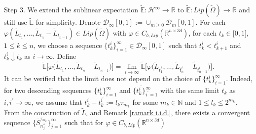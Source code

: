 \documentclass[a4paper,oneside,10pt]{article}%
\numberwithin{equation}{section}
\begin{document}
Step 3. We extend the sublinear expectation $\mathbb{\tilde{E}}:\mathcal{H}
^{\infty}\rightarrow \mathbb{R}$ to $\mathbb{\tilde{E}}:Lip(\tilde{\Omega
})\rightarrow \mathbb{R}$ and still use $\mathbb{\tilde{E}}$ for simplicity.
Denote $\mathcal{D}_{\infty}[0,1]:=\cup_{m\geq0}\mathcal{D}_{m}[0,1]$. For
each $\varphi(\tilde{L}_{t_{1}},\ldots,\tilde{L}_{t_{n}}-\tilde{L}_{t_{n-1}
})\in Lip(\tilde{\Omega})$ with $\varphi \in C_{b,Lip}(\mathbb{R}^{n\times3d}
)$, for each $t_{k}\in \lbrack0,1]$, $1\leq k\leq n$, we choose a sequence
$\{t_{k}^{i}\}_{i=1}^{\infty}\in \mathcal{D}_{\infty}[0,1]$ such that
$t_{k}^{i}<t_{k+1}^{i}$ and $t_{k}^{i}\downarrow t_{k}$ as $i\rightarrow
\infty$. Define
\[
\mathbb{\tilde{E}}\big[\varphi \big(\tilde{L}_{t_{1}},\ldots,\tilde{L}_{t_{n}%
}-\tilde{L}_{t_{n-1}}\big)\big]=\lim_{i\rightarrow \infty}\mathbb{\tilde{E}%
}\big[\varphi \big(\tilde{L}_{t_{1}^{i}},\ldots,\tilde{L}_{t_{n}^{i}}-\tilde
{L}_{t_{n-1}^{i}}\big)\big].
\]
It can be verified that the limit does not depend on the choice of
$\{t_{k}^{i}\}_{i=1}^{\infty}$. Indeed, for two descending sequences
$\{t_{k}^{i}\}_{i=1}^{\infty}$ and $\{t_{k}^{i^{\prime}}\}_{i^{\prime}%
=1}^{\infty}$ with the same limit $t_{k}$ as $i,i^{\prime}\rightarrow \infty$,
we assume that $t_{k}^{i}-t_{k}^{i^{\prime}}:=l_{k}\tau_{m_{k}}$ for some
$m_{k}\in \mathbb{N}$ and $1\leq l_{k}\leq2^{m_{k}}$. From the construction of
$\tilde{L}_{\cdot}$ and Remark \ref{ramark i.i.d.}, there exists a convergent
sequence $\{ \bar{S}_{n_{j}^{\ast}}^{\tau_{m_{k}}}\}_{j=1}^{\infty}$ such that
for $\varphi \in C_{b,Lip}(\mathbb{R}^{n\times3d})$
\end{document}
